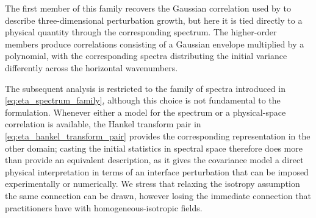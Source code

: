 The first member of this family recovers the Gaussian correlation used by \citet{frame-towne-2024} to describe three-dimensional perturbation growth, but here it is tied directly to a physical quantity through the corresponding spectrum. The higher-order members produce correlations consisting of a Gaussian envelope multiplied by a polynomial, with the corresponding spectra distributing the initial variance differently across the horizontal wavenumbers.

The subsequent analysis is restricted to the family of spectra introduced in \eqref{eq:eta_spectrum_family}, although this choice is not fundamental to the formulation. Whenever either a model for the spectrum or a physical-space correlation is available, the Hankel transform pair in \eqref{eq:eta_hankel_transform_pair} provides the corresponding representation in the other domain; casting the initial statistics in spectral space therefore does more than provide an equivalent description, as it gives the covariance model a direct physical interpretation in terms of an interface perturbation that can be imposed experimentally or numerically. We stress that relaxing the isotropy assumption the same connection can be drawn, however losing the immediate connection that practitioners have with homogeneous-isotropic fields.
